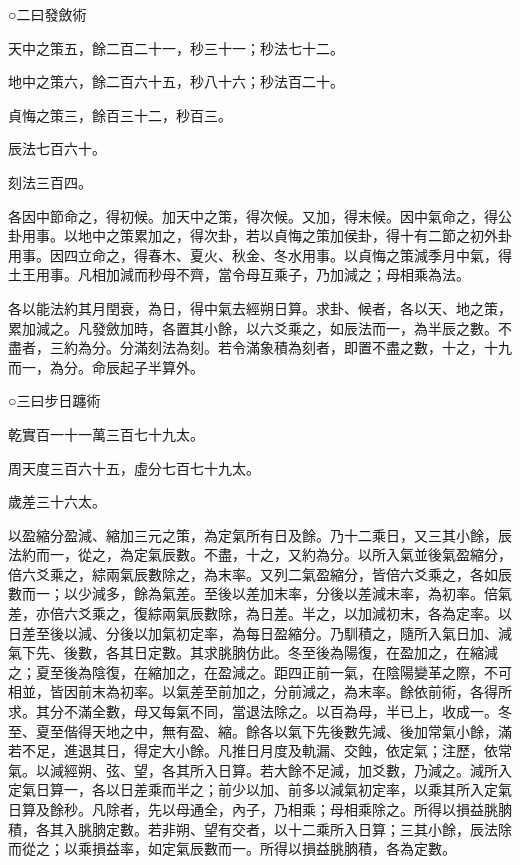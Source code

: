 \begin{pinyinscope}
 ○二曰發斂術



 天中之策五，餘二百二十一，秒三十一；秒法七十二。



 地中之策六，餘二百六十五，秒八十六；秒法百二十。



 貞悔之策三，餘百三十二，秒百三。



 辰法七百六十。



 刻法三百四。



 各因中節命之，得初候。加天中之策，得次候。又加，得末候。因中氣命之，得公卦用事。以地中之策累加之，得次卦，若以貞悔之策加侯卦，得十有二節之初外卦用事。因四立命之，得春木、夏火、秋金、冬水用事。以貞悔之策減季月中氣，得土王用事。凡相加減而秒母不齊，當令母互乘子，乃加減之；母相乘為法。



 各以能法約其月閏衰，為日，得中氣去經朔日算。求卦、候者，各以天、地之策，累加減之。凡發斂加時，各置其小餘，以六爻乘之，如辰法而一，為半辰之數。不盡者，三約為分。分滿刻法為刻。若令滿象積為刻者，即置不盡之數，十之，十九而一，為分。命辰起子半算外。



 ○三曰步日躔術



 乾實百一十一萬三百七十九太。



 周天度三百六十五，虛分七百七十九太。



 歲差三十六太。



 以盈縮分盈減、縮加三元之策，為定氣所有日及餘。乃十二乘日，又三其小餘，辰法約而一，從之，為定氣辰數。不盡，十之，又約為分。以所入氣並後氣盈縮分，倍六爻乘之，綜兩氣辰數除之，為末率。又列二氣盈縮分，皆倍六爻乘之，各如辰數而一；以少減多，餘為氣差。至後以差加末率，分後以差減末率，為初率。倍氣差，亦倍六爻乘之，復綜兩氣辰數除，為日差。半之，以加減初末，各為定率。以日差至後以減、分後以加氣初定率，為每日盈縮分。乃馴積之，隨所入氣日加、減氣下先、後數，各其日定數。其求朓朒仿此。冬至後為陽復，在盈加之，在縮減之；夏至後為陰復，在縮加之，在盈減之。距四正前一氣，在陰陽變革之際，不可相並，皆因前末為初率。以氣差至前加之，分前減之，為末率。餘依前術，各得所求。其分不滿全數，母又每氣不同，當退法除之。以百為母，半已上，收成一。冬至、夏至偕得天地之中，無有盈、縮。餘各以氣下先後數先減、後加常氣小餘，滿若不足，進退其日，得定大小餘。凡推日月度及軌漏、交蝕，依定氣；注歷，依常氣。以減經朔、弦、望，各其所入日算。若大餘不足減，加爻數，乃減之。減所入定氣日算一，各以日差乘而半之；前少以加、前多以減氣初定率，以乘其所入定氣日算及餘秒。凡除者，先以母通全，內子，乃相乘；母相乘除之。所得以損益朓朒積，各其入朓朒定數。若非朔、望有交者，以十二乘所入日算；三其小餘，辰法除而從之；以乘損益率，如定氣辰數而一。所得以損益朓朒積，各為定數。




\end{pinyinscope}
